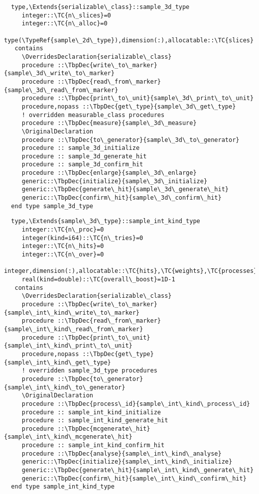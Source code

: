 \begin{Verbatim}
  type,\Extends{serializable\_class}::sample_3d_type
     integer::\TC{n\_slices}=0
     integer::\TC{n\_alloc}=0
     type(\TypeRef{sample\_2d\_type}),dimension(:),allocatable::\TC{slices}
   contains
     \OverridesDeclaration{serializable\_class}
     procedure ::\TbpDec{write\_to\_marker}{sample\_3d\_write\_to\_marker}
     procedure ::\TbpDec{read\_from\_marker}{sample\_3d\_read\_from\_marker}
     procedure ::\TbpDec{print\_to\_unit}{sample\_3d\_print\_to\_unit}
     procedure,nopass ::\TbpDec{get\_type}{sample\_3d\_get\_type}
     ! overridden measurable_class procedures
     procedure ::\TbpDec{measure}{sample\_3d\_measure}
     \OriginalDeclaration
     procedure ::\TbpDec{to\_generator}{sample\_3d\_to\_generator}
     procedure :: sample_3d_initialize
     procedure :: sample_3d_generate_hit
     procedure :: sample_3d_confirm_hit
     procedure ::\TbpDec{enlarge}{sample\_3d\_enlarge}
     generic::\TbpDec{initialize}{sample\_3d\_initialize}
     generic::\TbpDec{generate\_hit}{sample\_3d\_generate\_hit}
     generic::\TbpDec{confirm\_hit}{sample\_3d\_confirm\_hit}
  end type sample_3d_type
\end{Verbatim}
\begin{Verbatim}
  type,\Extends{sample\_3d\_type}::sample_int_kind_type
     integer::\TC{n\_proc}=0
     integer(kind=i64)::\TC{n\_tries}=0
     integer::\TC{n\_hits}=0
     integer::\TC{n\_over}=0
     integer,dimension(:),allocatable::\TC{hits},\TC{weights},\TC{processes}
     real(kind=double)::\TC{overall\_boost}=1D-1
   contains
     \OverridesDeclaration{serializable\_class}
     procedure ::\TbpDec{write\_to\_marker}{sample\_int\_kind\_write\_to\_marker}
     procedure ::\TbpDec{read\_from\_marker}{sample\_int\_kind\_read\_from\_marker}
     procedure ::\TbpDec{print\_to\_unit}{sample\_int\_kind\_print\_to\_unit}
     procedure,nopass ::\TbpDec{get\_type}{sample\_int\_kind\_get\_type}
     ! overridden sample_3d_type procedures
     procedure ::\TbpDec{to\_generator}{sample\_int\_kind\_to\_generator}
     \OriginalDeclaration
     procedure ::\TbpDec{process\_id}{sample\_int\_kind\_process\_id}
     procedure :: sample_int_kind_initialize
     procedure :: sample_int_kind_generate_hit
     procedure ::\TbpDec{mcgenerate\_hit}{sample\_int\_kind\_mcgenerate\_hit}
     procedure :: sample_int_kind_confirm_hit
     procedure ::\TbpDec{analyse}{sample\_int\_kind\_analyse}
     generic::\TbpDec{initialize}{sample\_int\_kind\_initialize}
     generic::\TbpDec{generate\_hit}{sample\_int\_kind\_generate\_hit}
     generic::\TbpDec{confirm\_hit}{sample\_int\_kind\_confirm\_hit}
  end type sample_int_kind_type
\end{Verbatim}
